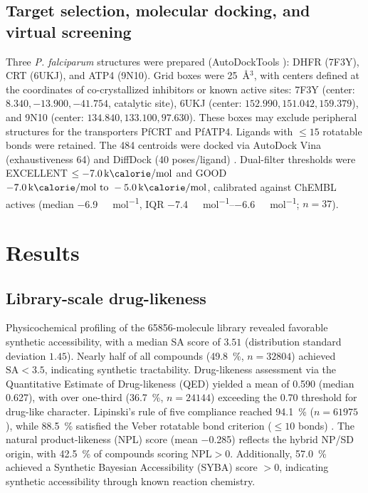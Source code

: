 \documentclass[journal=jcisd8,manuscript=article]{achemso}
\begin{document}
\subsection{Target selection, molecular docking, and virtual screening}

Three \emph{P. falciparum} structures were prepared (AutoDockTools \cite{Eberhardt2021}): DHFR (7F3Y), CRT (6UKJ), and ATP4 (9N10). Grid boxes were \qty{25}{\angstrom}$^3$, with centers defined at the coordinates of co-crystallized inhibitors or known active sites: 7F3Y (center: $8.340, -13.900, -41.754$, catalytic site), 6UKJ (center: $152.990, 151.042, 159.379$), and 9N10 (center: $134.840, 133.100, 97.630$). These boxes may exclude peripheral structures for the transporters PfCRT and PfATP4. Ligands with $\leq \num{15}$ rotatable bonds were retained. The \num{484} centroids were docked via AutoDock Vina (exhaustiveness \num{64}) and DiffDock (\num{40} poses/ligand) \cite{Corso2023}. Dual-filter thresholds were EXCELLENT $\leq \qty{-7.0}{\kilo\calorie\per\mole}$ and GOOD $\qtyrange{-7.0}{-5.0}{\kilo\calorie\per\mole}$, calibrated against ChEMBL actives (median \qty{-6.9}{\kilo\calorie\per\mole}, IQR \qtyrange{-7.4}{-6.6}{\kilo\calorie\per\mole}; $n=37$).

\section{Results}
\label{sec:results}

\subsection{Library-scale drug-likeness}
\label{sec:results-library}

Physicochemical profiling of the \num{65856}-molecule library revealed favorable synthetic accessibility, with a median SA score of $\num{3.51}$ (distribution
standard deviation $\num{1.45}$). Nearly half of all compounds (\qty{49.8}{\percent}, $n = \num{32804}$) achieved $\text{SA} < \num{3.5}$, indicating synthetic
tractability. Drug-likeness assessment via the Quantitative Estimate of Drug-likeness (QED) yielded a mean of \num{0.590} (median \num{0.627}), with over
one-third (\qty{36.7}{\percent}, $n = \num{24144}$) exceeding the \num{0.70} threshold for drug-like character. Lipinski's rule of five compliance reached
\qty{94.1}{\percent} ($n = \num{61975}$), while \qty{88.5}{\percent} satisfied the Veber rotatable bond criterion ($\leq\num{10}$ bonds) \cite{Lipinski2004,
Veber2002, Bayliss2016, Hann2004}. The natural product-likeness (NPL) score (mean \num{-0.285}) reflects the hybrid NP/SD origin, with \qty{42.5}{\percent} of
compounds scoring $\text{NPL} > \num{0}$. Additionally, \qty{57.0}{\percent} achieved a Synthetic Bayesian Accessibility (SYBA) score $> \num{0}$, indicating
synthetic accessibility through known reaction chemistry.
\end{document}
